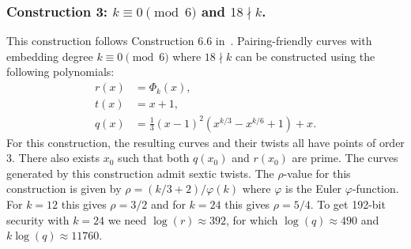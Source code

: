 
\subsubsection{Construction 3: $k \equiv 0 \pmod{6}$ and $18 \nmid k$.}
\label{con3}

This construction follows {Construction 6.6} in~\cite{2010/freeman}.
Pairing-friendly curves with embedding degree $k \equiv 0 \pmod{6}$ where $18 \nmid k$
can be constructed using the following polynomials:
\begin{align*}
r(x) &= \Phi_k(x),	\\
t(x) &= x+1,		\\
q(x) &= \tfrac{1}{3} (x-1)^2 (x^{k/3} - x^{k/6} + 1) + x.
\end{align*}
For this construction,
the resulting curves and their twists all have points of order 3.
There also exists $x_0$ such that both $q(x_0)$ and $r(x_0)$ are prime.
The curves generated by this construction admit sextic twists.
The $\rho$-value for this construction is given by $\rho = (k/3+2)/\varphi(k)$
where $\varphi$ is the Euler $\varphi$-function.
For $k=12$ this gives $\rho = 3/2$ and for $k=24$ this gives $\rho = 5/4$.
To get 192-bit security with $k=24$ we need $\log(r)\approx 392$, for which
$\log(q) \approx 490$ and $k\log(q) \approx 11760$.


